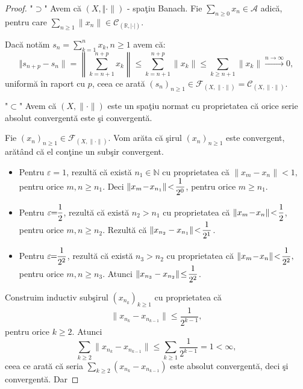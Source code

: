 \documentclass[ a4paper, 12pt]{report}
\theoremstyle{definition}
\theoremstyle{remark}
\numberwithin{equation}{section}
\begin{document}
\begin{proof}
"$\supset$"
Avem c\u a  $(X, \Vert \cdot \rVert)$ - spa\c tiu Banach. Fie $\sum\limits_{n \geq 0} x_n \in \mathcal{A}$ adic\u a, pentru care $\sum\limits_{n \geq 1} \lVert x_n \rVert \in \mathcal{C}_{(\mathbb{R},\lvert \cdot \rvert)}$.

Dac\u a not\u am $s_n = \sum\limits_{k=1}^{n} x_k, n \geq 1$ avem c\u a:
$$ \Vert s_{n+p} - s_n \rVert =\left\lVert \sum\limits_{k=n+1}^{n+p} x_k \right\rVert
\leq  \sum\limits_{k=n+1}^{n+p} \lVert x_k \rVert \leq \sum\limits_{k \geq n+1} \lVert x_k \rVert \stackrel{n \rightarrow \infty}{\longrightarrow}0,$$ uniform\u a \^in raport cu $p$, ceea ce arat\u a $(s_n)_{n \geq 1} \in \mathcal{F}_{(X,\lVert \cdot \rVert)} = \mathcal{C}_{(X, \lVert  \cdot\rVert)}.$

"$\subset$" Avem c\u a $(X,\lVert \cdot \rVert)$ este un spa\c tiu normat cu proprietatea c\u a  orice serie absolut convergent\u a este \c si convergent\u a.

Fie $(x_n)_{n \geq 1} \in \mathcal{F}_{(X, \lVert \cdot \rVert)}.$ Vom ar\u ata c\u a \c sirul $(x_n)_{n \geq 1}$ este convergent, ar\u at\^and c\u a el con\c tine un sub\c sir convergent.
\begin{itemize}
\item Pentru $\varepsilon\!=\!1$, rezult\u a c\u a exist\u a $n_1 \in \mathbb{N}$ cu proprietatea c\u a $\lVert x_m\! -\! x_n \rVert\! <\! 1,$ pentru orice $m,n \geq n_1$. Deci $\lVert x_m\!-\!x_{n_1}\rVert\!<\!\displaystyle\frac{1}{2^0}$, pentru orice  $m \geq n_1$.
\item Pentru $\varepsilon\!\!=\!\!\displaystyle\frac{1}{2}$,  rezult\u a c\u a exist\u a $n_2 > n_1$ cu proprietatea c\u a $\lVert x_m\! -\! x_n \rVert\! <\! \displaystyle\frac{1}{2}$, pentru orice $m,n \geq n_2$. Rezult\u a c\u  a $\lVert x_{n_2}-x_{n_1}\rVert\!<\!\displaystyle\frac{1}{2^1}$.
\item Pentru $\varepsilon\!\!=\!\!\displaystyle\frac{1}{2^2}$,  rezult\u a c\u a exist\u a $n_3\!\!>\!\!n_2$ cu proprietatea c\u a $\lVert x_m \!-\! x_n \rVert\! <\! \displaystyle\frac{1}{2^2},$ pentru orice $m,n \geq n_3$. Atunci $\lVert x_{n_3}-x_{n_2}\rVert\! \leq\! \displaystyle\frac{1}{2^2}$.
\end{itemize}
Construim inductiv sub\c sirul $(x_{n_k})_{k \geq 1}$ cu proprietatea c\u a
$$ \lVert x_{n_k} - x_{n_{k-1}} \rVert \leq \frac{1}{2^{k-1}},$$ pentru orice $k \geq 2$. Atunci
$$\sum\limits_{k \geq 2} \lVert x_{n_k} - x_{n_{k-1}} \rVert \leq \sum\limits_{k \geq 1}\frac{1}{2^{k-1}} = 1 < \infty,$$ ceea ce arat\u a c\u a seria
$\sum\limits_{k \geq 2} (x_{n_k} - x_{n_{k-1}})$ este absolut convergent\u a, deci \c si convergent\u a. Dar


\end{proof}
\end{document}
